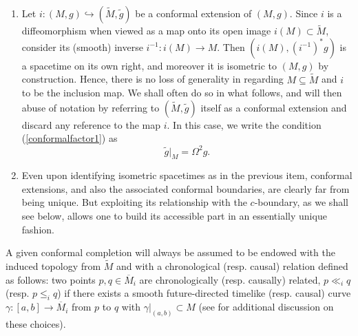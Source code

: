 \begin{remark}
{\begin{enumerate}
\item Let $i:(M,g) \hookrightarrow (\tilde{M},\tilde{g})$ be a conformal extension of $(M,g)$. Since $i$ is a diffeomorphism when viewed as a map onto its open image $i(M)\subset \tilde{M}$, consider its (smooth) inverse $i^{-1}: i(M) \rightarrow M$. Then $(i(M),(i ^{-1})^{\ast} g)$ is a spacetime on its own right, and moreover it is isometric to $(M,g)$ by construction. Hence, there is no loss of generality in regarding $M \subseteq \tilde{M}$ and $i$ to be the inclusion map. We shall often do so in what follows, and will then abuse of notation by referring to $(\tilde{M},\tilde{g})$ itself as a conformal extension and discard any reference to the map $i$. In this case, we write the condition (\ref{conformalfactor1}) as
\[
\label{conformalfactor3}
\tilde{g}|_{M} = \Omega^2 g.
\]

\item Even upon identifying isometric spacetimes as in the previous item, conformal extensions, and also the associated conformal boundaries, are clearly far from being unique. But exploiting its relationship with the $c$-boundary, as we shall see below, allows one to build its accessible part in an essentially unique fashion.
\end{enumerate}
}
\end{remark}

A given conformal completion will always be assumed to be endowed with the induced topology from $\tilde{M}$ and with a chronological (resp. causal) relation defined as follows: two points $p,q\in \overline{M}_i$ are chronologically (resp. causally) related, $p\ll_i q$ (resp. $p \leq _i q$) if there exists a smooth future-directed timelike (resp. causal) curve $\gamma:[a,b]\rightarrow \overline{M}_i$ from $p$ to $q$ with $\gamma|_{(a,b)}\subset M$ (see \cite[Section 4.1]{Floresfinaldefinitioncausal2011} for additional discussion on these choices).

